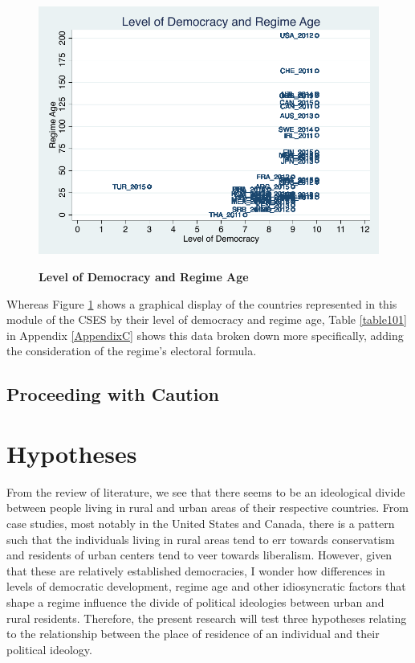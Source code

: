 \documentclass[12pt, titlepage]{article}
\newcommand\tb{\textbf}
\begin{document}
\begin{figure}[ht!]    \centering
	{	 \includegraphics[width=\textwidth]{DemAge}}
	\caption{\tb{Level of Democracy and Regime Age}}\label{figure2}
\end{figure}

Whereas Figure \ref{figure2} shows a graphical display of the countries represented in this module of the CSES by their level of democracy and regime age, Table \ref{table101} in Appendix \ref{AppendixC} shows this data broken down more specifically, adding the consideration of the regime's electoral formula. 


\subsection{Proceeding with Caution}



\section{Hypotheses}

From the review of literature, we see that there seems to be an ideological divide between people living in rural and urban areas of their respective countries. From case studies, most notably in the United States and Canada, there is a pattern such that the individuals living in rural areas tend to err towards conservatism and residents of urban centers tend to veer towards liberalism. However, given that these are relatively established democracies, I wonder how differences in levels of democratic development, regime age and other idiosyncratic factors that shape a regime influence the divide of political ideologies between urban and rural residents. Therefore, the present research will test three hypotheses relating to the relationship between the place of residence of an individual and their political ideology.
\end{document}
